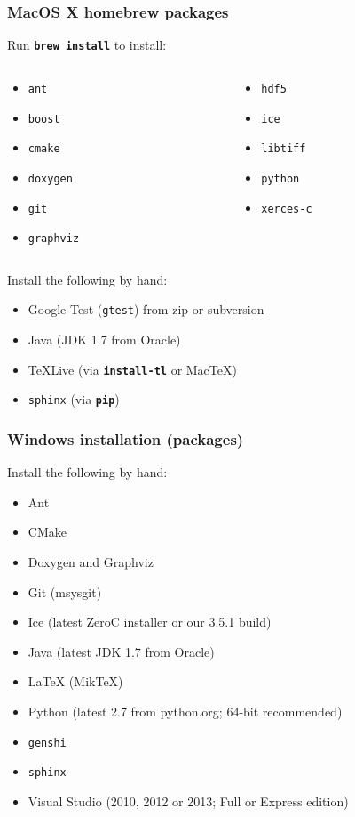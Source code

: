 \documentclass{beamer}
\newcommand{\cmd}[1]{\textbf{\texttt{#1}}}
\newcommand{\pkg}[1]{\texttt{#1}}
\begin{document}
\begin{frame}
  \frametitle{MacOS X homebrew packages}
Run \cmd{brew install} to install:
  \begin{columns}
    \begin{column}{.5\linewidth}
      \begin{itemize}
      \item[] \pkg{ant}
      \item[] \pkg{boost}
      \item[] \pkg{cmake}
      \item[] \pkg{doxygen}
      \item[] \pkg{git}
      \item[] \pkg{graphviz}
      \end{itemize}
    \end{column}
    \begin{column}{.5\linewidth}
      \begin{itemize}
      \item[] \pkg{hdf5}
      \item[] \pkg{ice}
      \item[] \pkg{libtiff}
      \item[] \pkg{python}
      \item[] \pkg{xerces-c}
      \end{itemize}
    \end{column}
  \end{columns}
\bigskip
Install the following by hand:
\begin{itemize}
\item Google Test (\pkg{gtest}) from zip or subversion
\item Java (JDK 1.7 from Oracle)
\item \TeX{}Live (via \cmd{install-tl} or Mac\TeX{})
\item \pkg{sphinx} (via \cmd{pip})
\end{itemize}
\end{frame}

\begin{frame}
  \frametitle{Windows installation (packages)}
  Install the following by hand:
\begin{itemize}
\item Ant
\item CMake
\item Doxygen and Graphviz
\item Git (msysgit)
\item Ice (latest ZeroC installer or our 3.5.1 build)
\item Java (latest JDK 1.7 from Oracle)
\item \LaTeX{} (Mik\TeX{})
\item Python (latest 2.7 from python.org; 64-bit recommended)
\item \pkg{genshi}
\item \pkg{sphinx}
\item Visual Studio (2010, 2012 or 2013; Full or Express edition)
\end{itemize}
\end{frame}
\end{document}
